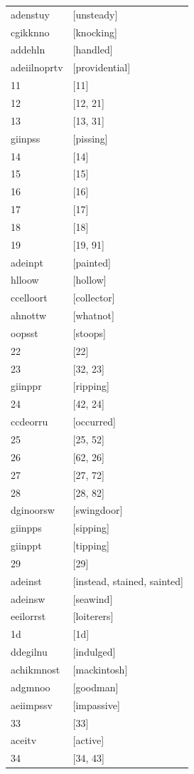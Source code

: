 \documentclass{article}
\begin{document}
\begin{tabular}{ll}
adenstuy & [unsteady] \\
cgikknno & [knocking] \\
addehln & [handled] \\
adeiilnoprtv & [providential] \\
11 & [11] \\
12 & [12, 21] \\
13 & [13, 31] \\
giinpss & [pissing] \\
14 & [14] \\
15 & [15] \\
16 & [16] \\
17 & [17] \\
18 & [18] \\
19 & [19, 91] \\
adeinpt & [painted] \\
hlloow & [hollow] \\
ccelloort & [collector] \\
ahnottw & [whatnot] \\
oopsst & [stoops] \\
22 & [22] \\
23 & [32, 23] \\
giinppr & [ripping] \\
24 & [42, 24] \\
ccdeorru & [occurred] \\
25 & [25, 52] \\
26 & [62, 26] \\
27 & [27, 72] \\
28 & [28, 82] \\
dginoorsw & [swingdoor] \\
giinpps & [sipping] \\
giinppt & [tipping] \\
29 & [29] \\
adeinst & [instead, stained, sainted] \\
adeinsw & [seawind] \\
eeilorrst & [loiterers] \\
1d & [1d] \\
ddegilnu & [indulged] \\
achikmnost & [mackintosh] \\
adgmnoo & [goodman] \\
aeiimpssv & [impassive] \\
33 & [33] \\
aceitv & [active] \\
34 & [34, 43] \\

\end{tabular}
\end{document}
